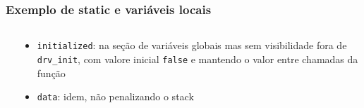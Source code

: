 \documentclass{beamer}
\begin{document}

\begin{frame}
	\frametitle{Exemplo de static e variáveis locais}
	\begin{columns}[T] %
		\begin{column}{.60\textwidth}
			
		\end{column}%
		\hfill%
		\begin{column}{.40\textwidth}
    {\footnotesize
	\begin{itemize}
	\item \texttt{initialized}: na seção de variáveis globais mas sem visibilidade fora de \texttt{drv\_init}, com valore inicial \texttt{false} e mantendo o valor entre chamadas da função
    \item \texttt{data}: idem, não penalizando o stack
	\end{itemize}
    }
		\end{column}%
	\end{columns}
\end{frame}
\end{document}
